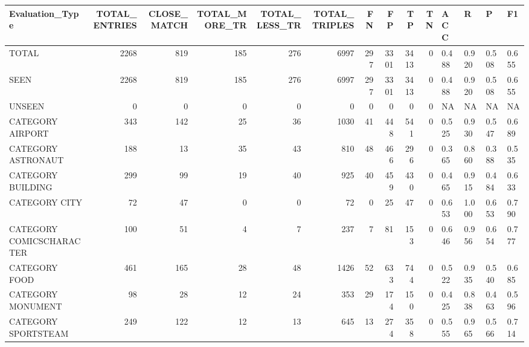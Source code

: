 \begin{tabular}{lrrrrrrrrrllll}
\hline
 Evaluation\_Type          &   TOTAL\_ENTRIES &   CLOSE\_MATCH &   TOTAL\_MORE\_TR &   TOTAL\_LESS\_TR &   TOTAL\_TRIPLES &   FN &   FP &   TP &   TN & ACC   & R     & P     & F1    \\
\hline
 TOTAL                    &            2268 &           819 &             185 &             276 &            6997 &  297 & 3301 & 3413 &    0 & 0.488 & 0.920 & 0.508 & 0.655 \\
 SEEN                     &            2268 &           819 &             185 &             276 &            6997 &  297 & 3301 & 3413 &    0 & 0.488 & 0.920 & 0.508 & 0.655 \\
 UNSEEN                   &               0 &             0 &               0 &               0 &               0 &    0 &    0 &    0 &    0 & NA    & NA    & NA    & NA    \\
 CATEGORY AIRPORT         &             343 &           142 &              25 &              36 &            1030 &   41 &  448 &  541 &    0 & 0.525 & 0.930 & 0.547 & 0.689 \\
 CATEGORY ASTRONAUT       &             188 &            13 &              35 &              43 &             810 &   48 &  466 &  296 &    0 & 0.365 & 0.860 & 0.388 & 0.535 \\
 CATEGORY BUILDING        &             299 &            99 &              19 &              40 &             925 &   40 &  459 &  430 &    0 & 0.465 & 0.915 & 0.484 & 0.633 \\
 CATEGORY CITY            &              72 &            47 &               0 &               0 &              72 &    0 &   25 &   47 &    0 & 0.653 & 1.000 & 0.653 & 0.790 \\
 CATEGORY COMICSCHARACTER &             100 &            51 &               4 &               7 &             237 &    7 &   81 &  153 &    0 & 0.646 & 0.956 & 0.654 & 0.777 \\
 CATEGORY FOOD            &             461 &           165 &              28 &              48 &            1426 &   52 &  633 &  744 &    0 & 0.522 & 0.935 & 0.540 & 0.685 \\
 CATEGORY MONUMENT        &              98 &            28 &              12 &              24 &             353 &   29 &  174 &  150 &    0 & 0.425 & 0.838 & 0.463 & 0.596 \\
 CATEGORY SPORTSTEAM      &             249 &           122 &              12 &              13 &             645 &   13 &  274 &  358 &    0 & 0.555 & 0.965 & 0.566 & 0.714 \\

\end{tabular}
